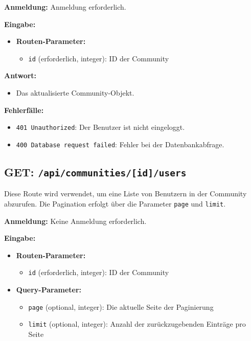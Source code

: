 \documentclass[a4paper,12pt]{article}
\begin{document}
\textbf{Anmeldung:} Anmeldung erforderlich.

\textbf{Eingabe:}
\begin{itemize}
    \item \textbf{Routen-Parameter:}
    \begin{itemize}
        \item \texttt{id} (erforderlich, integer): ID der Community
    \end{itemize}
\end{itemize}

\textbf{Antwort:}
\begin{itemize}
    \item Das aktualisierte Community-Objekt.
\end{itemize}

\textbf{Fehlerfälle:}
\begin{itemize}
    \item \texttt{401 Unauthorized}: Der Benutzer ist nicht eingeloggt.
    \item \texttt{400 Database request failed}: Fehler bei der Datenbankabfrage.
\end{itemize}

\subsection{GET: \texttt{/api/communities/[id]/users}}

Diese Route wird verwendet, um eine Liste von Benutzern in der Community abzurufen. Die Pagination erfolgt über die Parameter \texttt{page} und \texttt{limit}.

\textbf{Anmeldung:} Keine Anmeldung erforderlich.

\textbf{Eingabe:}
\begin{itemize}
    \item \textbf{Routen-Parameter:}
    \begin{itemize}
        \item \texttt{id} (erforderlich, integer): ID der Community
    \end{itemize}
    \item \textbf{Query-Parameter:}
    \begin{itemize}
        \item \texttt{page} (optional, integer): Die aktuelle Seite der Paginierung
        \item \texttt{limit} (optional, integer): Anzahl der zurückzugebenden Einträge pro Seite
    \end{itemize}
\end{itemize}
\end{document}
